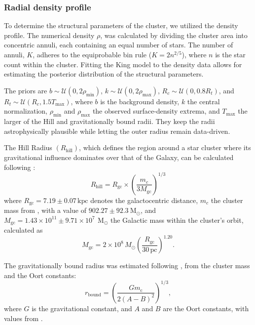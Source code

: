 \documentclass{aa}
\begin{document}
\subsubsection{Radial density profile}
To determine the structural parameters of the cluster, we utilized the \citet{1962AJ.....67..471K} density profile. The numerical density $\rho$, was calculated by dividing the cluster area into concentric annuli, each containing an equal number of stars. The number of annuli, $K$, adheres to the equiprobable bin rule ($K = 2n^{2/5}$), where $n$ is the star count within the cluster. Fitting the King model to the density data allows for estimating the posterior distribution of the structural parameters.

The priors are $b \sim \mathcal{U}(0, 2\rho_{\mathrm{min}})$, $k \sim \mathcal{U}(0, 2\rho_{\mathrm{max}})$, $R_c \sim \mathcal{U}(0, 0.8R_t)$, and $R_t \sim \mathcal{U}(R_c, 1.5T_{\mathrm{max}})$, where $b$ is the background density, $k$ the central normalization, $\rho_{\mathrm{min}}$ and $\rho_{\mathrm{max}}$ the observed surface-density extrema, and $T_{\mathrm{max}}$ the larger of the Hill and gravitationally bound radii. They keep the radii astrophysically plausible while letting the outer radius remain data-driven.

The Hill Radius $(R_\mathrm{hill})$, which defines the region around a star cluster where its gravitational influence dominates over that of the Galaxy, can be calculated following \citet{2019A&A...627A.119C}:
\begin{equation}
R_\mathrm{hill} = R_{\mathrm{gc}} \times \left(\frac{m_c}{3M_{\mathrm{gc}}}\right)^{1/3}
\end{equation}
where $ R_{\mathrm{gc}} = 7.19 \pm 0.07\,\mathrm{kpc} $ denotes the galactocentric distance, $ m_c $ the cluster mass from \citet{2024arXiv240305143H}, with a value of $902.27 \pm 92.3~\mathrm{M_{\odot}}$, and $ M_{\mathrm{gc}} = 1.43 \times 10^{11} \pm 9.71 \times 10^7\,~\mathrm{M_{\odot}} $ the Galactic mass within the cluster's orbit, calculated as
\begin{equation}
	M_{\mathrm{gc}} = 2  \times 10^8\,M_\odot \left(\frac{R_{\mathrm{gc}}}{30\,\mathrm{pc}}\right)^{1.20}.
\end{equation}

The gravitationally bound radius was estimated following \citet{1998MNRAS.299..955P}, from the cluster mass and the Oort constants:
\begin{equation}
	r_\mathrm{bound} = \left( \frac{Gm_{\mathrm{c}}}{2(A-B)^2} \right)^{1/3},
\end{equation}
where $G$ is the gravitational constant, and $A$ and $B$ are the Oort constants, with values from \citet{2017MNRAS.468L..63B}.
\end{document}
